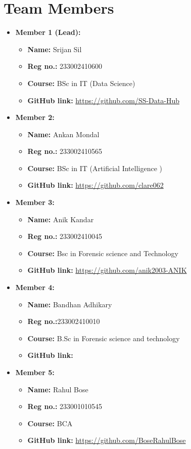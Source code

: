 \documentclass[a4paper,12pt]{article}
\begin{document}
\section*{Team Members}
\begin{itemize}
    \item \textbf{Member 1 (Lead):}
    \begin{itemize}
        \item \textbf{Name:} Srijan Sil
        \item \textbf{Reg no.:} 233002410600
        \item \textbf{Course:} BSc in IT (Data Science)
        \item \textbf{GitHub link:} \url{https://github.com/SS-Data-Hub}
    \end{itemize}
    \item \textbf{Member 2:} 
    \begin{itemize}
        \item \textbf{Name:} Ankan Mondal
        \item \textbf{Reg no.:} 233002410565
        \item \textbf{Course:} BSc in IT (Artificial Intelligence )
        \item \textbf{GitHub link:} \url{https://github.com/clare062}
    \end{itemize}
    \item \textbf{Member 3:}
    \begin{itemize}
        \item \textbf{Name:} Anik Kandar
        \item \textbf{Reg no.:} 233002410045
        \item \textbf{Course:} Bsc in Forensic science and Technology 
        \item \textbf{GitHub link:} \url{https://github.com/anik2003-ANIK}
    \end{itemize}
    \item \textbf{Member 4:}
    \begin{itemize}
        \item \textbf{Name:} Bandhan Adhikary 
        \item \textbf{Reg no.:}233002410010 
        \item \textbf{Course:} B.Sc in Forensic science and technology 
        \item \textbf{GitHub link:} \url{}
    \end{itemize}
    \item \textbf{Member 5:}
    \begin{itemize}
        \item \textbf{Name:} Rahul Bose
        \item \textbf{Reg no.:} 233001010545
        \item \textbf{Course:} BCA
        \item \textbf{GitHub link:} \url{https://github.com/BoseRahulBose}
    \end{itemize}
\end{itemize}
\end{document}
